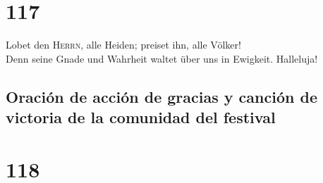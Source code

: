 \hypertarget{section-116}{%
\section{117}\label{section-116}}

 Lobet den \textsc{Herrn}, alle Heiden; preiset ihn, alle
Völker!\\
 Denn seine Gnade und Wahrheit waltet über uns in
Ewigkeit. Halleluja!

\hypertarget{oraciuxf3n-de-acciuxf3n-de-gracias-y-canciuxf3n-de-victoria-de-la-comunidad-del-festival}{%
\subsection{Oración de acción de gracias y canción de victoria de la
comunidad del
festival}\label{oraciuxf3n-de-acciuxf3n-de-gracias-y-canciuxf3n-de-victoria-de-la-comunidad-del-festival}}

\hypertarget{section-117}{%
\section{118}\label{section-117}}


